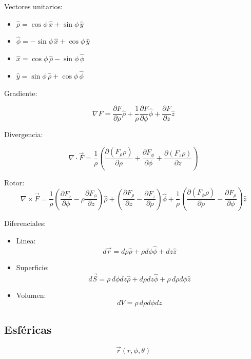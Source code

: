 Vectores unitarios:

\begin{itemize}
    \item $\hat{\rho} = \cos{\phi}\,\hat{x}+\sin{\phi}\,\hat{y}$
    \item $\hat{\phi} = -\sin{\phi}\,\hat{x}+\cos{\phi}\,\hat{y}$
    \item $\hat{x}=
    \cos{\phi}\,\hat{\rho}-\sin{\phi}\,\hat{\phi}$
    \item $\hat{y}=
    \sin{\phi}\,\hat{\rho}+\cos{\phi}\,\hat{\phi}$
\end{itemize}

\medbreak

Gradiente:

\[\nabla F = \frac{\partial F}{\partial \rho}\hat{\rho} + \frac{1}{\rho}\frac{\partial F}{\partial \phi}\hat{\phi} + \frac{\partial F}{\partial z}\hat{z}\]

Divergencia:

\[\nabla \cdot \vec{F} = \frac{1}{\rho}\left(\frac{\partial(F_{\rho}\rho)}{\partial\rho}+\frac{\partial F_{\phi}}{\partial\phi}+\frac{\partial(F_{z}\rho)}{\partial z}\right)\]

Rotor:
\[\nabla\times\vec{F} = \frac{1}{\rho}\left(\frac{\partial F_{z}}{\partial \phi}-\rho\frac{\partial F_{\phi}}{\partial z}\right)\hat{\rho} + \left(\frac{\partial F_{\rho}}{\partial z}-\frac{\partial F_{z}}{\partial \rho}\right)\hat{\phi} + \frac{1}{\rho}\left(\frac{\partial(F_{\phi}\rho)}{\partial \rho}-\frac{\partial F_{\rho}}{\partial \phi}\right)\hat{z}\]

\medbreak

Diferenciales:

\begin{itemize}
    \item Linea:
    \[d\vec{r} = d\rho\hat{\rho} + \rho d\phi\hat{\phi}+dz\hat{z}\]
    \item Superficie:
    \[d\vec{S} = \rho\,d\phi dz\hat{\rho}+d\rho dz\hat{\phi}+\rho\, d\rho d\phi\hat{z}\]
    \item Volumen:
    \[dV = \rho\,d\rho d\phi dz\]
\end{itemize}

\newpage
\subsection{Esféricas}

\[\Vec{r}(r,\phi,\theta)\]

